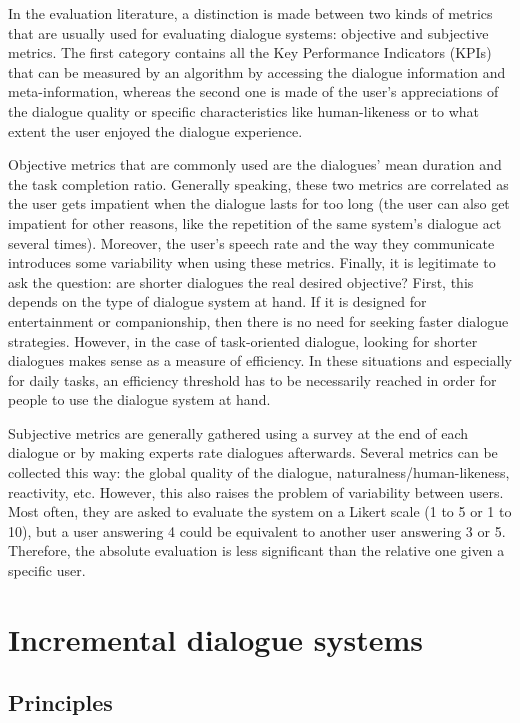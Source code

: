                         In the evaluation literature, a distinction is made between two kinds of metrics that are usually used for evaluating dialogue systems: objective and subjective metrics. The first category contains all the Key Performance Indicators (KPIs) that can be measured by an algorithm by accessing the dialogue information and meta-information, whereas the second one is made of the user's appreciations of the dialogue quality or specific characteristics like human-likeness or to what extent the user enjoyed the dialogue experience.

                        Objective metrics that are commonly used are the dialogues' mean duration and the task completion ratio. Generally speaking, these two metrics are correlated as the user gets impatient when the dialogue lasts for too long (the user can also get impatient for other reasons, like the repetition of the same system's dialogue act several times). Moreover, the user's speech rate and the way they communicate introduces some variability when using these metrics. Finally, it is legitimate to ask the question: are shorter dialogues the real desired objective? First, this depends on the type of dialogue system at hand. If it is designed for entertainment or companionship, then there is no need for seeking faster dialogue strategies. However, in the case of task-oriented dialogue, looking for shorter dialogues makes sense as a measure of efficiency. In these situations and especially for daily tasks, an efficiency threshold has to be necessarily reached in order for people to use the dialogue system at hand.

                        Subjective metrics are generally gathered using a survey at the end of each dialogue or by making experts rate dialogues afterwards. Several metrics can be collected this way: the global quality of the dialogue, naturalness/human-likeness, reactivity, etc. However, this also raises the problem of variability between users. Most often, they are asked to evaluate the system on a Likert scale (1 to 5 or 1 to 10), but a user answering 4 could be equivalent to another user answering 3 or 5. Therefore, the absolute evaluation is less significant than the relative one given a specific user.


\section{Incremental dialogue systems}

\subsection{Principles}

